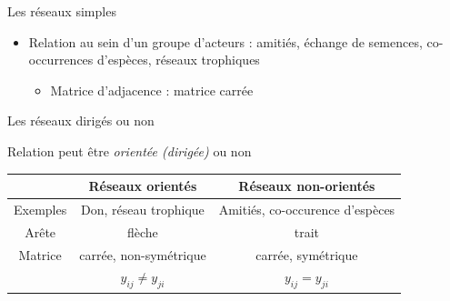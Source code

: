 \documentclass[compress,10pt]{beamer}
\begin{document}
\begin{frame}{Les réseaux simples}

\begin{itemize}

\item Relation au sein d'un groupe d'acteurs :  amitiés, échange de semences, co-occurrences d'espèces, réseaux trophiques
\begin{itemize}
\item Matrice d'adjacence : matrice carrée
\end{itemize}

\end{itemize}
\end{frame}
\begin{frame}{Les réseaux dirigés ou non}

\begin{center}
Relation peut être \emph{orientée (dirigée)} ou non
\end{center}


\begin{tabular}{ccc}
\hline
& \textbf{Réseaux orientés} & \textbf{Réseaux non-orientés}\\
\hline
Exemples &  Don,  réseau trophique & Amitiés, co-occurence d'espèces\\
\hline
Arête & flèche & trait\\
\hline
Matrice  & carrée, non-symétrique& carrée, symétrique\\
& $y_{ij} \neq y_{ji}$ & $y_{ij} = y_{ji}$\\
\hline
\end{tabular}
 

\end{frame}
\end{document}
